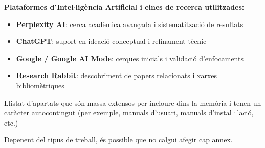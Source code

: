\documentclass[CAT]{TFUOC}%
\begin{document}
\noindent\textbf{Plataformes d'Intel$\cdot$ligència Artificial i eines de recerca utilitzades:}
\begin{itemize}
\item \textbf{Perplexity AI}: cerca acadèmica avançada i sistematització de resultats
\item \textbf{ChatGPT}: suport en ideació conceptual i refinament tècnic
\item \textbf{Google / Google AI Mode}: cerques inicials i validació d'enfocaments
\item \textbf{Research Rabbit}: descobriment de papers relacionats i xarxes bibliomètriques
\end{itemize}


\newpage
\appendix
Llistat d’apartats que són massa extensos per incloure dins la memòria i tenen un caràcter autocontingut (per exemple, manuals d’usuari, manuals d’instal·lació, etc.)
 
Depenent del tipus de treball, és possible que no calgui afegir cap annex.
\end{document}
